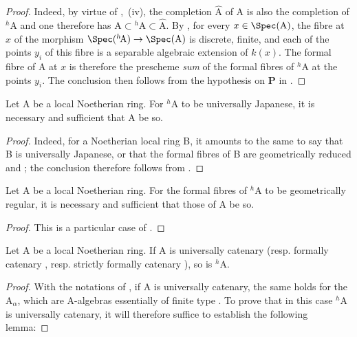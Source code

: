 \begin{proof}
Indeed, by virtue of ,~(iv), the completion $\hat{\mathrm{A}}$ of A is also the completion of ${}^h\!\mathrm{A}$ and one therefore has $\mathrm{A}\subset{}^h\!\mathrm{A}\subset\hat{\mathrm{A}}$.
By , for every $x\in\Spec(\mathrm{A})$, the fibre at $x$ of the morphism $\Spec({}^h\!\mathrm{A})\to\Spec(\mathrm{A})$ is discrete, finite, and each of the points $y_i$ of this fibre is a separable algebraic extension of $k(x)$.
The formal fibre of A at $x$ is therefore the prescheme \emph{sum} of the formal fibres of ${}^h\!\mathrm{A}$ at the points $y_i$.
The conclusion then follows from the hypothesis on $\boldsymbol{P}$ in .
\end{proof}

\begin{corollary}[18.7.3]
\label{IV.18.7.3}
Let $\mathrm{A}$ be a local Noetherian ring.
For ${}^h\!\mathrm{A}$ to be universally Japanese, it is necessary and sufficient that A be so.
\end{corollary}

\begin{proof}
Indeed, for a Noetherian local ring B, it amounts to the same to say that B is universally Japanese, or that the formal fibres of B are geometrically reduced  and ;
the conclusion therefore follows from .
\end{proof}

\begin{corollary}[18.7.4]
\label{IV.18.7.4}
Let $\mathrm{A}$ be a local Noetherian ring.
For the formal fibres of ${}^h\!\mathrm{A}$ to be geometrically regular, it is necessary and sufficient that those of A be so.
\end{corollary}

\begin{proof}
This is a particular case of .
\end{proof}

\begin{proposition}[18.7.5]
\label{IV.18.7.5}
Let $\mathrm{A}$ be a local Noetherian ring.
If A is universally catenary  (resp. formally catenary , resp. strictly formally catenary ), so is ${}^h\!\mathrm{A}$.
\end{proposition}

\begin{proof}
With the notations of , if A is universally catenary, the same holds for the $\mathrm{A}_\alpha$, which are A-algebras essentially of finite type .
To prove that in this case ${}^h\!\mathrm{A}$ is universally catenary, it will therefore suffice to establish the following lemma:
\end{proof}

